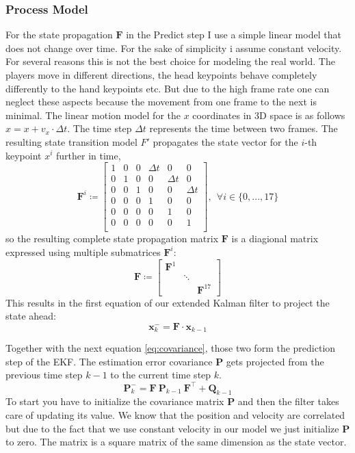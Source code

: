 \subsubsection{Process Model}
For the state propagation $\mathbf{F}$ in the Predict step I use a simple linear model that does not change over time. For the sake of simplicity i assume constant velocity. For several reasons this is not the best choice for modeling the real world. The players move in different directions, the head keypoints behave completely differently to the hand keypoints etc. But due to the high frame rate one can neglect these aspects because the movement from one frame to the next is minimal. The linear motion model for the $x$ coordinates in 3D space is as follows $x = x + v_x\cdot \Delta t$. The time step $\Delta t$ represents the time between two frames. The resulting state transition model $F'$ propagates the state vector for the $i$-th keypoint $x^i$ further in time,
\begin{equation}
\mathbf{F}^i \coloneqq 
\begin{bmatrix}
1 & 0 & 0 & \Delta t & 0 & 0 \\
0 & 1 & 0 & 0 & \Delta t & 0 \\
0 & 0 & 1 & 0 & 0 & \Delta t \\
0 & 0 & 0 & 1 & 0 & 0 \\
0 & 0 & 0 & 0 & 1 & 0 \\
0 & 0 & 0 & 0 & 0 & 1 \\
\end{bmatrix}, \ \ \forall i \in \{0,...,17\}
\end{equation}
so the resulting complete state propagation matrix $\mathbf{F}$ is a diagional matrix expressed using multiple submatrices $\mathbf{F}^i$:
\begin{equation}
\mathbf{F} \coloneqq 
\begin{bmatrix}
\mathbf{F}^1 & & \\
& \ddots & \\
& & \mathbf{F}^{17}
\end{bmatrix}
\end{equation}
This results in the first equation of our extended Kalman filter to project the state ahead:
\begin{equation}\label{eq:state}
\mathbf{x}_k^- = \mathbf{F} \cdot \mathbf{x}_{k-1}
\end{equation}

Together with the next equation \ref{eq:covariance}, those two form the prediction step of the EKF. The estimation error covariance $\mathbf{P}$ gets projected  from the previous time step $k-1$ to the current time step $k$.
\begin{equation}\label{eq:covariance}
\mathbf{P}_k^- = \mathbf{F}\ \mathbf{P}_{k-1}\ \mathbf{F}^\intercal + \mathbf{Q}_{k-1}
\end{equation}
To start you have to initialize the covariance matrix $\mathbf{P}$ and then the filter takes care of updating its value. We know that the position and velocity are correlated but due to the fact that we use constant velocity in our model we just initialize $\mathbf{P}$ to zero. The matrix is a square matrix of the same dimension as the state vector. 

